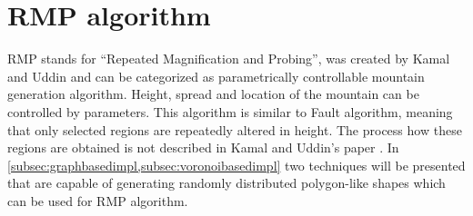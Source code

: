\documentclass[11pt,a4paper,twoside,openright]{report}
\begin{document}
\section{RMP algorithm}
RMP stands for ``Repeated Magnification and Probing'', was created by Kamal and Uddin \cite{Kamal:2007:PCT:1321261.1321264} and can be categorized as parametrically controllable mountain generation algorithm. Height, spread and location of the mountain can be controlled by parameters. This algorithm is similar to Fault algorithm, meaning that only selected regions are repeatedly altered in height. The process how these regions are obtained is not described in Kamal and Uddin's paper \cite{Kamal:2007:PCT:1321261.1321264}. In \cref{subsec:graphbasedimpl,subsec:voronoibasedimpl} two techniques will be presented that are capable of generating randomly distributed polygon-like shapes which can be used for RMP algorithm.
\end{document}
